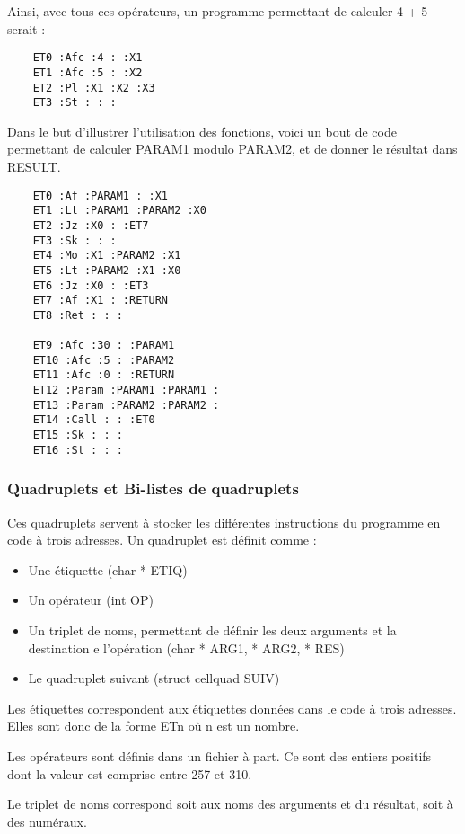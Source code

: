 \documentclass{article}
\begin{document}
\newpage

Ainsi, avec tous ces opérateurs, un programme permettant de calculer 4 + 5 serait :
\begin{lstlisting}
    ET0 :Afc :4 : :X1
    ET1 :Afc :5 : :X2
    ET2 :Pl :X1 :X2 :X3
    ET3 :St : : :
\end{lstlisting}

Dans le but d'illustrer l'utilisation des fonctions, voici un bout de code permettant de calculer PARAM1 modulo PARAM2, et de donner le résultat dans RESULT.

\begin{lstlisting}
    ET0 :Af :PARAM1 : :X1
    ET1 :Lt :PARAM1 :PARAM2 :X0
    ET2 :Jz :X0 : :ET7
    ET3 :Sk : : :
    ET4 :Mo :X1 :PARAM2 :X1
    ET5 :Lt :PARAM2 :X1 :X0
    ET6 :Jz :X0 : :ET3
    ET7 :Af :X1 : :RETURN
    ET8 :Ret : : :

    ET9 :Afc :30 : :PARAM1
    ET10 :Afc :5 : :PARAM2
    ET11 :Afc :0 : :RETURN
    ET12 :Param :PARAM1 :PARAM1 :
    ET13 :Param :PARAM2 :PARAM2 :
    ET14 :Call : : :ET0
    ET15 :Sk : : :
    ET16 :St : : :
\end{lstlisting}

\subsubsection{Quadruplets et Bi-listes de quadruplets}

Ces quadruplets servent à stocker les différentes instructions du programme en code à trois adresses. Un quadruplet est définit comme :

\begin{itemize}
\item Une étiquette (char * ETIQ)
\item Un opérateur (int OP)
\item Un triplet de noms, permettant de définir les deux arguments et la destination e l'opération (char * ARG1, * ARG2, * RES)
\item Le quadruplet suivant (struct cellquad SUIV)
\end{itemize}

Les étiquettes correspondent aux étiquettes données dans le code à trois adresses. Elles sont donc de la forme ETn où n est un nombre.

Les opérateurs sont définis dans un fichier à part. Ce sont des entiers positifs dont la valeur est comprise entre 257 et 310.

Le triplet de noms correspond soit aux noms des arguments et du résultat, soit à des numéraux.
\end{document}
